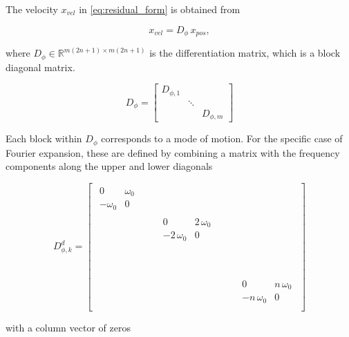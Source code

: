 \documentclass[]{article}
\begin{document}

The velocity $x_{vel}$ in \eqref{eq:residual_form} is obtained from

\begin{equation}
	x_{vel} = D_{\phi} \, x_{pos},
\end{equation}

\noindent{}where $D_{\phi} \in \mathbb{R}^{m(2n+1) \times m(2n+1)}$ is the differentiation matrix, which is a block diagonal matrix.

\begin{equation}\label{eq:Dphi}
	D_{\phi} =
	\begin{bmatrix}
	D_{\phi,1} & & \\
	& \ddots & \\
	 & & D_{\phi,m}
	\end{bmatrix}
\end{equation}

\noindent{}Each block within $D_{\phi}$ corresponds to a mode of motion.
For the specific case of Fourier expansion, these are defined by combining a matrix with the frequency components along the upper and lower diagonals

\begin{equation}\label{eq:Dphi_blocks}
D^d_{\phi,k} = \begin{bmatrix}
	\begin{matrix} 0 &  \omega_0 \\ -\omega_0 & 0 \end{matrix} \\
	& \begin{matrix} 	0 & 2 \, \omega_0 \\ -2 \, \omega_0 & 0	\end{matrix} \\
	\phantom{\begin{matrix} 	0 & 2 \, \omega_0 \\ -2 \, \omega_0 & 0	\end{matrix}}\\
	&&&&\begin{matrix} 0 & n \, \omega_0 \\ -n \, \omega_0 & 0 \end{matrix} \\
\end{bmatrix}
\end{equation}

\noindent{}with a column vector of zeros
\end{document}
